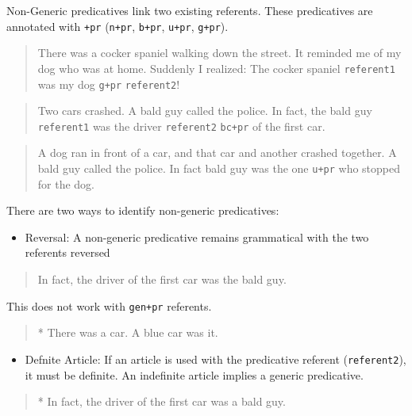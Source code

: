 \documentclass[
]{book}
\providecommand{\tightlist}{%
  \setlength{\itemsep}{0pt}\setlength{\parskip}{0pt}}
\begin{document}
Non-Generic predicatives link two existing referents.
These predicatives are annotated with \texttt{+pr} (\texttt{n+pr}, \texttt{b+pr}, \texttt{u+pr}, \texttt{g+pr}).

\begin{quote}
There was a cocker spaniel walking down the street.
It reminded me of my dog who was at home.
Suddenly I realized:
The cocker spaniel \texttt{referent1} was my dog \texttt{g+pr} \texttt{referent2}!
\end{quote}

\begin{quote}
Two cars crashed.
A bald guy called the police.
In fact, the bald guy \texttt{referent1}
was the driver \texttt{referent2} \texttt{bc+pr} of the first car.
\end{quote}

\begin{quote}
A dog ran in front of a car, and
that car and another crashed together.
A bald guy called the police.
In fact bald guy was the one \texttt{u+pr} who stopped for the dog.
\end{quote}

There are two ways to identify non-generic predicatives:

\begin{itemize}
\tightlist
\item
  Reversal: A non-generic predicative remains grammatical
  with the two referents reversed
\end{itemize}

\begin{quote}
In fact, the driver of the first car was the bald guy.
\end{quote}

This does not work with \texttt{gen+pr} referents.

\begin{quote}
* There was a car.
A blue car was it.
\end{quote}

\begin{itemize}
\tightlist
\item
  Defnite Article: If an article is used
  with the predicative referent (\texttt{referent2}),
  it must be definite.
  An indefinite article implies a generic predicative.
\end{itemize}

\begin{quote}
* In fact, the driver of the first car was a bald guy.
\end{quote}
\end{document}
